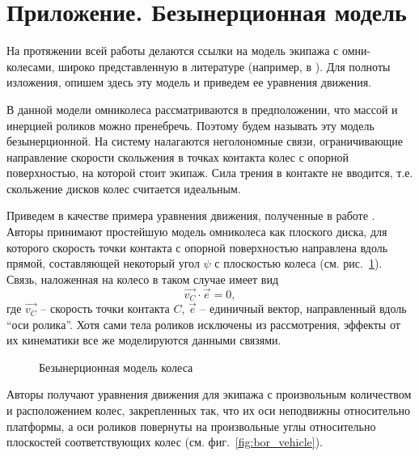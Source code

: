 \section{Приложение. Безынерционная модель}\label{sect:bezinerz}

На протяжении всей работы делаются ссылки на модель экипажа с омни-колесами, широко представленную в литературе (например, в \cite{Borisov2011, formalskii, ZobovaTatarinovPMM}). Для полноты изложения, опишем здесь эту модель и приведем ее уравнения движения.

В данной модели омниколеса рассматриваются в предположении, что массой и инерцией роликов можно пренебречь. Поэтому будем называть эту модель безынерционной. На систему налагаются неголономные связи, ограничивающие направление скорости скольжения в точках контакта колес с опорной поверхностью, на которой стоит экипаж. Сила трения в контакте не вводится, т.е. скольжение дисков колес считается идеальным.

Приведем в качестве примера уравнения движения, полученные в работе \cite{Borisov2011}. Авторы принимают простейшую модель омниколеса как плоского диска, для которого скорость точки контакта с опорной поверхностью направлена вдоль прямой, составляющей некоторый угол $\psi$ с плоскостью колеса (см. рис.~\ref{fig:bor_wheel_scheme}). Связь, наложенная на колесо в таком случае имеет вид
$$
    \vec{v_C} \cdot \vec{e} = 0,
$$
где $\vec{v_C}$ -- скорость точки контакта $C$, $\vec{e}$ -- единичный вектор, направленный вдоль ``оси ролика''. Хотя сами тела роликов исключены из рассмотрения, эффекты от их кинематики все же моделируются данными связями.\\

\begin{figure}[ht!]
    \centering
    \caption{Безынерционная модель колеса}
    \label{fig:bor_wheel_scheme}
\end{figure}

Авторы \cite{Borisov2011} получают уравнения движения для экипажа с произвольным количеством и расположением колес, закрепленных так, что их оси неподвижны относительно платформы, а оси роликов повернуты на произвольные углы относительно плоскостей соответствующих колес (см. фиг.~\ref{fig:bor_vehicle}).

